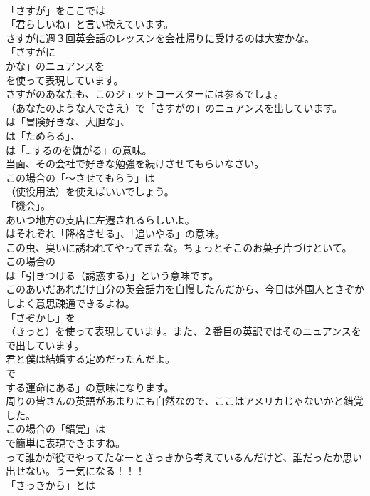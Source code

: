 \documentclass[8pt]{extreport}
\begin{document}
\begin{CJK}{UTF8}{min}
\\	「さすが」をここでは
\\	「君らしいね」と言い換えています。	
\\	さすがに週３回英会話のレッスンを会社帰りに受けるのは大変かな。 
\\	「さすがに 
\\	かな」のニュアンスを
\\	を使って表現しています。	
\\	さすがのあなたも、このジェットコースターには参るでしょ。 
\\	（あなたのような人でさえ）で「さすがの」のニュアンスを出しています。
\\	は「冒険好きな、大胆な」、
\\	は「ためらる」、
\\	は「…するのを嫌がる」の意味。	
\\	当面、その会社で好きな勉強を続けさせてもらいなさい。 
\\	この場合の「～させてもらう」は
\\	（使役用法）を使えばいいでしょう。
\\	「機会」。	
\\	あいつ地方の支店に左遷されるらしいよ。 
\\	はそれぞれ「降格させる」、「追いやる」の意味。	
\\	この虫、臭いに誘われてやってきたな。ちょっとそこのお菓子片づけといて。 
\\	この場合の
\\	は「引きつける（誘惑する）」という意味です。	
\\	このあいだあれだけ自分の英会話力を自慢したんだから、今日は外国人とさぞかしよく意思疎通できるよね。 
\\	「さぞかし」を 
\\	（きっと）を使って表現しています。また、２番目の英訳ではそのニュアンスを 
\\	で出しています。	
\\	君と僕は結婚する定めだったんだよ。 
\\	で
\\	する運命にある」の意味になります。	
\\	周りの皆さんの英語があまりにも自然なので、ここはアメリカじゃないかと錯覚した。 
\\	この場合の「錯覚」は
\\	で簡単に表現できますね。	
\\	って誰かが役でやってたなーとさっきから考えているんだけど、誰だったか思い出せない。うー気になる！！！ 
\\	「さっきから」とは

\end{CJK}
\end{document}
